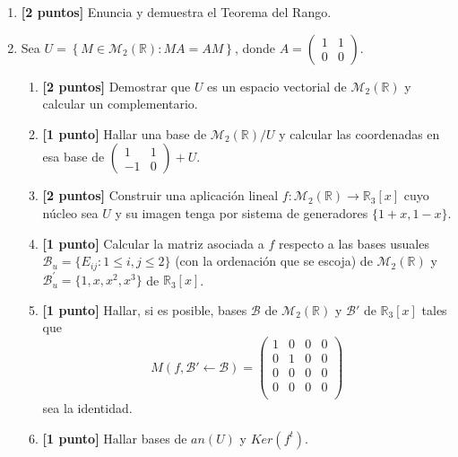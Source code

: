 \documentclass[12pt]{article}
\begin{document}
    \begin{enumerate}
    \item \textbf{[2 puntos]} Enuncia y demuestra el Teorema del Rango.

    \item Sea $\displaystyle U = \left\{ M \in \mathcal{M}_2(\mathbb{R}) : MA = AM \right\}$, donde $\displaystyle A = \left( \begin{array}{cc}
        1 & 1 \\
        0 & 0
    \end{array}\right)$.

    \begin{enumerate}
        \addtolength{\itemsep}{1em}
        \item \textbf{[2 puntos]} Demostrar que $U$ es un espacio vectorial de $\mathcal{M}_2(\mathbb{R})$ y calcular un complementario.

        \item \textbf{[1 punto]} Hallar una base de $\mathcal{M}_2(\mathbb{R})/U$ y calcular las coordenadas en esa base de $\displaystyle \left( \begin{array}{cc}
        1 & 1 \\
        -1 & 0
        \end{array} \right) + U$.

        \item \textbf{[2 puntos]} Construir una aplicación lineal $f:\mathcal{M}_2(\mathbb{R}) \to \mathbb{R}_3[x]$ cuyo núcleo sea $U$ y su imagen tenga por sistema de generadores $\{1+x, 1-x\}$.

        \item \textbf{[1 punto]} Calcular la matriz asociada a $f$ respecto a las bases usuales $\mathcal{B}_u=\{E_{ij}:1\leq i,j\leq2\}$ (con la ordenación que se escoja) de $\mathcal{M}_2(\mathbb{R})$ y $\mathcal{B}_{u}^{'} = \{1,x,x^2,x^3\}$ de $\mathbb{R}_3[x]$.

        \item \textbf{[1 punto]} Hallar, si es posible, bases $\mathcal{B}$ de $\mathcal{M}_2(\mathbb{R})$ y $\mathcal{B}'$ de $\mathbb{R}_3[x]$ tales que
        \begin{equation*}
            M(f, \mathcal{B}' \longleftarrow \mathcal{B}) = \left( \begin{array}{cccc}
                1 & 0 & 0 & 0 \\
                0 & 1 & 0 & 0 \\
                0 & 0 & 0 & 0 \\
                0 & 0 & 0 & 0 \\
            \end{array} \right)
        \end{equation*}
        sea la identidad.

        \item \textbf{[1 punto]} Hallar bases de $an(U)$ y $Ker(f^t)$.

    \end{enumerate}
\end{enumerate}
\end{document}
